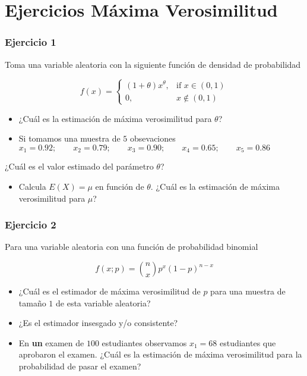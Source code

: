 \documentclass[
]{book}
\providecommand{\tightlist}{%
  \setlength{\itemsep}{0pt}\setlength{\parskip}{0pt}}
\begin{document}
\hypertarget{ejercicios-muxe1xima-verosimilitud}{%
\section{Ejercicios Máxima Verosimilitud}\label{ejercicios-muxe1xima-verosimilitud}}

\hypertarget{ejercicio-1-9}{%
\subsubsection{Ejercicio 1}\label{ejercicio-1-9}}

Toma una variable aleatoria con la siguiente función de densidad de probabilidad

\[
f(x)=
\begin{cases}
    (1+\theta)x^\theta,& \text{if } x\in (0,1)\\
    0,&  x\notin (0,1)
\end{cases}
\]

\begin{itemize}
\item
  ¿Cuál es la estimación de máxima verosimilitud para \(\theta\)?
\item
  Si tomamos una muestra de \(5\) obsevaciones
  \(x_1 = 0.92; \qquad x_2 = 0.79; \qquad x_3 = 0.90; \qquad x_4 = 0.65; \qquad x_5 = 0.86\)
\end{itemize}

¿Cuál es el valor estimado del parámetro \(\theta\)?

\begin{itemize}
\tightlist
\item
  Calcula \(E(X)=\mu\) en función de \(\theta\). ¿Cuál es la estimación de máxima verosimilitud para \(\mu\)?
\end{itemize}

\hypertarget{ejercicio-2-9}{%
\subsubsection{Ejercicio 2}\label{ejercicio-2-9}}

Para una variable aleatoria con una función de probabilidad binomial

\[f(x; p)=\binom nxp^x(1-p)^{n-x}\]

\begin{itemize}
\item
  ¿Cuál es el estimador de máxima verosimilitud de \(p\) para una muestra de tamaño \(1\) de esta variable aleatoria?
\item
  ¿Es el estimador insesgado y/o consistente?
\item
  En \textbf{un} examen de \(100\) estudiantes observamos \(x_1=68\) estudiantes que aprobaron el examen. ¿Cuál es la estimación de máxima verosimilitud para la probabilidad de pasar el examen?
\end{itemize}
\end{document}
